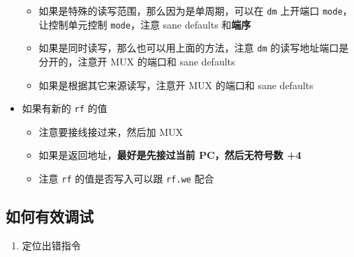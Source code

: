 \documentclass[12pt,AutoFakeBold,AutoFakeSlant]{article}
\providecommand{\tightlist}{%
  \setlength{\itemsep}{0pt}\setlength{\parskip}{0pt}}
\begin{document}
\begin{itemize}
  \begin{itemize}
  \tightlist
  \item
    如果是特殊的读写范围，那么因为是单周期，可以在 \texttt{dm} 上开端口
    \texttt{mode}，让控制单元控制 \texttt{mode}，注意 sane defaults
    和\textbf{端序}
  \item
    如果是同时读写，那么也可以用上面的方法，注意 \texttt{dm}
    的读写地址端口是分开的，注意开 MUX 的端口和 sane defaults
  \item
    如果是根据其它来源读写，注意开 MUX 的端口和 sane defaults
  \end{itemize}
\item
  如果有新的 \texttt{rf} 的值

  \begin{itemize}
  \tightlist
  \item
    注意要接线接过来，然后加 MUX
  \item
    如果是返回地址，\textbf{最好是先接过当前 PC，然后无符号数 +4}
  \item
    注意 \texttt{rf} 的值是否写入可以跟 \texttt{rf.we} 配合
  \end{itemize}
\end{itemize}

\hypertarget{ux5982ux4f55ux6709ux6548ux8c03ux8bd5}{%
\subsection{如何有效调试}\label{ux5982ux4f55ux6709ux6548ux8c03ux8bd5}}

\begin{enumerate}
\def\labelenumi{\arabic{enumi}.}
\tightlist
\item
  定位出错指令
\end{enumerate}
\end{document}
